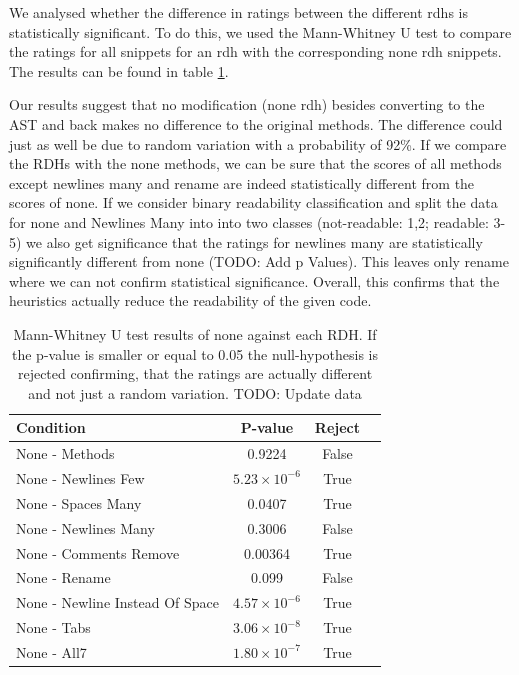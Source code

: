 \documentclass[%
class=scrreprt,
chapterprefix=false,%
open=right,%
twoside=false,%
paper=a4,%
logofile={Logo\_zentral\_farbig\_EN.png},%
thesistype=master,%
UKenglish,%
]{se2thesis}
\theoremstyle{definition}
\begin{document}
	We analysed whether the difference in ratings between the different rdhs is statistically significant. To do this, we used the Mann-Whitney U test to compare the ratings for all snippets for an rdh with the corresponding none rdh snippets. The results can be found in table \ref{tab:survey_statistical_evidence}.
	
	Our results suggest that no modification (none rdh) besides converting to the AST and back makes no difference to the original methods. The difference could just as well be due to random variation with a probability of 92\%. If we compare the RDHs with the none methods, we can be sure that the scores of all methods except newlines many and rename are indeed statistically different from the scores of none. If we consider binary readability classification and split the data for none and Newlines Many into into two classes (not-readable: 1,2; readable: 3-5) we also get significance that the ratings for newlines many are statistically significantly different from none (TODO: Add p Values). This leaves only rename where we can not confirm statistical significance. Overall, this confirms that the heuristics actually reduce the readability of the given code.
	
	\begin{table}[h]
		\centering
		\begin{tabular}{lccc}
			\toprule
			\textbf{Condition} & \textbf{P-value} & \textbf{Reject} \\
			\midrule
			None - Methods & 0.9224 & False \\
			None - Newlines Few & $5.23 \times 10^{-6}$ & True \\
			None - Spaces Many & 0.0407 & True \\
			None - Newlines Many & 0.3006 & False \\
			None - Comments Remove & 0.00364 & True \\
			None - Rename & 0.099 & False \\
			None - Newline Instead Of Space & $4.57 \times 10^{-6}$ & True \\
			None - Tabs & $3.06 \times 10^{-8}$ & True \\
			None - All7 & $1.80 \times 10^{-7}$ & True \\
			\bottomrule
		\end{tabular}
		\caption{Mann-Whitney U test results of none against each RDH. If the p-value is smaller or equal to 0.05 the null-hypothesis is rejected confirming, that the ratings are actually different and not just a random variation. TODO: Update data}
		\label{tab:survey_statistical_evidence}
	\end{table}
\end{document}
